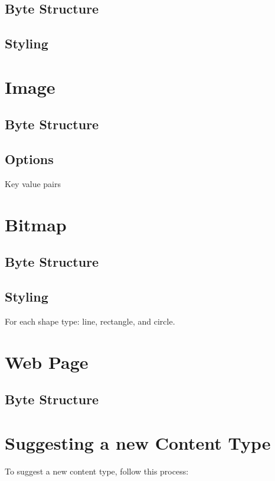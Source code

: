 \documentclass{report}
\begin{document}
\subsection{Byte Structure}
\subsection{Styling}
\section{Image}
\subsection{Byte Structure}
\subsection{Options}
Key value pairs
\section{Bitmap}
\subsection{Byte Structure}
\subsection{Styling}
For each shape type: line, rectangle, and circle.
\section{Web Page}
\subsection{Byte Structure}
\section{Suggesting a new Content Type}
To suggest a new content type, follow this process:
\end{document}
